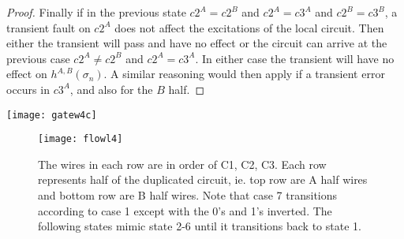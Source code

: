 \documentclass{article}
\begin{document}
\begin{proof}
Finally if in the previous state $c2^A=c2^B$ and $c2^A=c3^A$ and $c2^B=c3^B$, a transient fault on $c2^A$ does not affect the excitations of the local circuit.  Then either the transient will pass and have no effect or the circuit can arrive at the previous case $c2^A\neq c2^B$ and $c2^A= c3^A$.  In either case the transient will have no effect on $h^{A,B}(\sigma_n)$.
A similar reasoning would then apply if a transient error occurs in $c3^A$, and also for the $B$ half.  
\end{proof}

\texttt{[image: gatew4c]}\newline
\begin{figure}
  \centering
    \texttt{[image: flowl4]}
  \caption{The wires in each row are in order of C1, C2, C3.  Each row represents half of the duplicated circuit, ie. top row are A half wires and bottom row are B half wires.  Note that case 7 transitions according to case 1 except with the 0's and 1's inverted.  The following states mimic state 2-6 until it transitions back to state 1.}
\end{figure}
\end{document}
